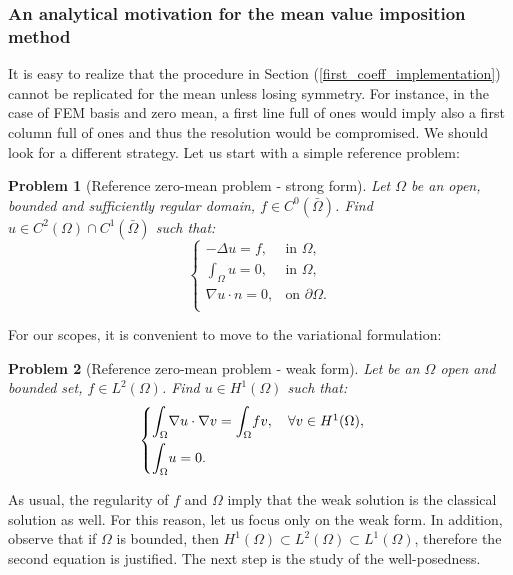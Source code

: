 \documentclass[a4paper,11pt]{article}
\newtheorem{problem}{Problem}
\begin{document}
\subsubsection{An analytical motivation for the mean value imposition method}
\noindent It is easy to realize that the procedure in Section (\ref{first_coeff_implementation}) cannot be replicated for the mean unless losing symmetry. For instance, in the case of FEM basis and zero mean, a first line full of ones would imply also a first column full of ones and thus the resolution would be compromised. We should look for a different strategy. Let us start with a simple reference problem: \\
\begin{problem}[Reference zero-mean problem - strong form] Let $\Omega$ be an open, bounded and sufficiently regular domain, $f\in C^0(\bar{\Omega})$. Find $u\in C^2(\Omega)\cap C^1(\bar{\Omega})$ such that:
\begin{equation*}
\begin{cases}
-\Delta{u}=f, & \text{in } \Omega,\\
\int_{\Omega} u = 0, & \text{in } \Omega, \\
\nabla u \cdot n = 0, & \text{on } \partial \Omega. \\
\end{cases}
\end{equation*}
\end{problem}\vspace{3mm}
\noindent For our scopes, it is convenient to move to the variational formulation:
\begin{problem}[Reference zero-mean problem - weak form]  \label{reference_problem} Let be an $\Omega$ open and bounded set, $f\in L^2(\Omega)$. Find $u\in H^1(\Omega)$ such that:
	\begin{equation*}
	\begin{cases}
	\mathlarger{\int}_{\Omega}\nabla u \cdot \nabla v = \mathlarger{\int}_{\Omega} fv, \quad \forall v \in H^1(\Omega),\\[2ex]
	\mathlarger{\int}_{\Omega}u = 0.
	\end{cases}
	\end{equation*}
\end{problem}
\noindent As usual, the regularity of $f$ and $\Omega$ imply that the weak solution is the classical solution as well. For this reason, let us focus only on the weak form. In addition, observe that if $\Omega$ is bounded, then $H^1(\Omega) \subset L^2(\Omega) \subset L^1(\Omega)$, therefore the second equation is justified. The next step is the study of the well-posedness.
\end{document}
